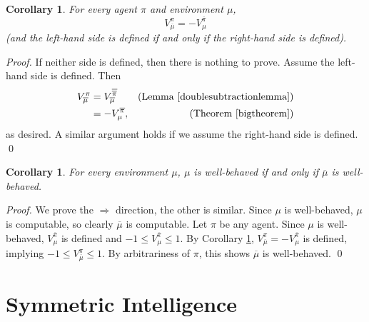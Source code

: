 \documentclass[runningheads]{llncs}
\newtheorem{mycorollary}[mytheorem]{Corollary}
\begin{document}
\begin{mycorollary}
\label{twistcorollary}
    For every agent $\pi$ and environment $\mu$,
    \[V^\pi_{\overline\mu}=-V^{\overline\pi}_{\mu}\]
    (and the left-hand side is defined if and only if the right-hand side is defined).
\end{mycorollary}

\begin{proof}
    If neither side is defined, then there is nothing to prove.
    Assume the left-hand side is defined. Then
    \begin{align*}
        V^\pi_{\overline\mu}
        &= V^{\overline{\overline\pi}}_{\overline\mu}
            &\mbox{(Lemma \ref{doublesubtractionlemma})}\\
        &= -V^{\overline\pi}_\mu, &\mbox{(Theorem \ref{bigtheorem})}
    \end{align*}
    as desired. A similar argument holds if we assume the right-hand side is defined.
    \qed
\end{proof}

\begin{mycorollary}
\label{wisminuswcorollary}
    For every environment $\mu$, $\mu$ is well-behaved if and only if $\overline\mu$
    is well-behaved.
\end{mycorollary}

\begin{proof}
    We prove the $\Rightarrow$ direction, the other is similar.
    Since $\mu$ is well-behaved, $\mu$ is computable, so clearly $\overline\mu$ is computable.
    Let $\pi$ be any agent. Since $\mu$ is well-behaved, $V^{\overline\pi}_\mu$ is defined
    and $-1\leq V^{\overline\pi}_\mu\leq 1$.
    By Corollary \ref{twistcorollary},
    $V^\pi_{\overline\mu}=-V^{\overline\pi}_\mu$ is defined,
    implying $-1\leq V^\pi_{\overline\mu}\leq 1$.
    By arbitrariness of $\pi$, this shows $\overline\mu$ is well-behaved.
    \qed
\end{proof}

\section{Symmetric Intelligence}
\label{mainsecn}
\end{document}
